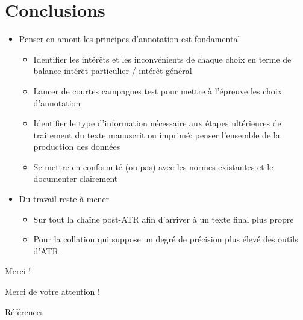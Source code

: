 \documentclass[11pt,aspectratio=169]{beamer}
\begin{document}
\section{Conclusions}

\begin{frame}
\begin{itemize}
\item Penser en amont les principes d'annotation est fondamental
\begin{itemize}
\item Identifier les intérêts et les inconvénients de chaque choix en terme de balance intérêt particulier / intérêt général
\item Lancer de courtes campagnes test pour mettre à l'épreuve les choix d'annotation
\item Identifier le type d'information nécessaire aux étapes ultérieures de traitement du texte manuscrit ou imprimé: penser l'ensemble de la production des données
\item Se mettre en conformité (ou pas) avec les normes existantes et le documenter clairement
\end{itemize}
\item Du travail reste à mener
\begin{itemize}
\item Sur tout la chaîne post-ATR afin d'arriver à un texte final plus propre
\item Pour la collation qui suppose un degré de précision plus élevé des outils d'ATR
\end{itemize}
\end{itemize}
\end{frame}


\begin{frame}{Merci !}
\begin{center}
Merci de votre attention !
\end{center}
\end{frame}



\begin{frame}[allowframebreaks]{Références}
\printbibliography
\end{frame}
\end{document}
